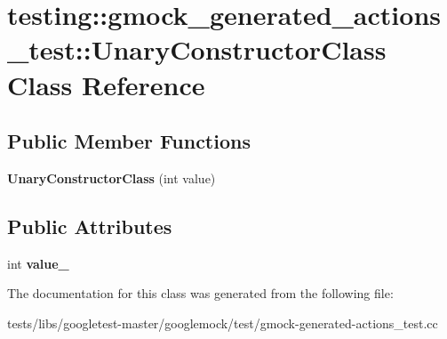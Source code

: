 \hypertarget{classtesting_1_1gmock__generated__actions__test_1_1UnaryConstructorClass}{}\section{testing\+:\+:gmock\+\_\+generated\+\_\+actions\+\_\+test\+:\+:Unary\+Constructor\+Class Class Reference}
\label{classtesting_1_1gmock__generated__actions__test_1_1UnaryConstructorClass}
\subsection*{Public Member Functions}
\begin{DoxyCompactItemize}
\item 
\mbox{\label{classtesting_1_1gmock__generated__actions__test_1_1UnaryConstructorClass_a35b2c0aab3928c1d558c11b6652a7262}} 
{\bfseries Unary\+Constructor\+Class} (int value)
\end{DoxyCompactItemize}
\subsection*{Public Attributes}
\begin{DoxyCompactItemize}
\item 
\mbox{\label{classtesting_1_1gmock__generated__actions__test_1_1UnaryConstructorClass_a5e96ce337c5eb7016eba2ea66ae46851}} 
int {\bfseries value\+\_\+}
\end{DoxyCompactItemize}


The documentation for this class was generated from the following file\+:\begin{DoxyCompactItemize}
\item 
tests/libs/googletest-\/master/googlemock/test/gmock-\/generated-\/actions\+\_\+test.\+cc\end{DoxyCompactItemize}
